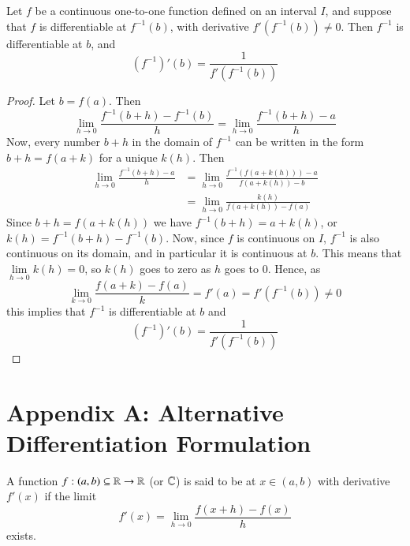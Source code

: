 \begin{theorem}
    Let $f$ be a continuous one-to-one function defined on an interval $I$, and suppose that $f$ is differentiable at $f^{-1}(b)$, with derivative $f'(f^{-1}(b)) \neq 0$. Then $f^{-1}$ is differentiable at $b$, and \begin{equation}
        (f^{-1})'(b) = \frac{1}{f'(f^{-1}(b))}
    \end{equation}
\end{theorem}
\begin{proof}
    Let $b = f(a)$. Then \begin{equation*}
        \lim\limits_{h\rightarrow 0}\frac{f^{-1}(b+h)-f^{-1}(b)}{h} = \lim\limits_{h\rightarrow 0}\frac{f^{-1}(b+h) - a}{h}
    \end{equation*}
    Now, every number $b+h$ in the domain of $f^{-1}$ can be written in the form $b+h = f(a+k)$ for a unique $k(h)$. Then \begin{align*}
        \lim\limits_{h\rightarrow 0}\frac{f^{-1}(b+h) - a}{h} &= \lim\limits_{h\rightarrow 0}\frac{f^{-1}(f(a+k(h)))-a}{f(a+k(h))-b} \\
        &= \lim\limits_{h\rightarrow 0}\frac{k(h)}{f(a+k(h))-f(a)}
    \end{align*}
    Since $b+h = f(a+k(h))$ we have $f^{-1}(b+h) = a+k(h)$, or $k(h) = f^{-1}(b+h)-f^{-1}(b)$. Now, since $f$ is continuous on $I$, $f^{-1}$ is also continuous on its domain, and in particular it is continuous at $b$. This means that $\lim\limits_{h\rightarrow 0}k(h) = 0$, so $k(h)$ goes to zero as $h$ goes to $0$. Hence, as $$\lim\limits_{k\rightarrow 0}\frac{f(a+k)-f(a)}{k} = f'(a) = f'(f^{-1}(b)) \neq 0$$ this implies that $f^{-1}$ is differentiable at $b$ and \begin{equation*}
        (f^{-1})'(b) = \frac{1}{f'(f^{-1}(b))}
    \end{equation*}
\end{proof}



%
\section*{Appendix A: Alternative Differentiation Formulation}
%


\begin{definition}
    A function $f:(a,b)\subseteq \mathbb R\rightarrow \mathbb R$ (or $\mathbb C$) is said to be  at $x \in (a,b)$ with derivative $f'(x)$ if the limit \begin{equation*}
        f'(x) = \lim\limits_{h\rightarrow 0}\frac{f(x+h) - f(x)}{h}
    \end{equation*}
    exists.
\end{definition}

